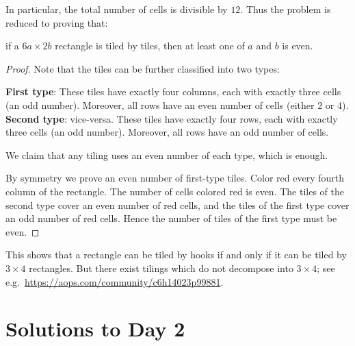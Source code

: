 \documentclass[11pt]{scrartcl}
\begin{document}
In particular, the total number of cells is divisible by $12$.
Thus the problem is reduced to proving that:
\begin{claim*}
  if a $6a \times 2b$ rectangle is tiled by tiles,
  then at least one of $a$ and $b$ is even.
\end{claim*}
\begin{proof}
  Note that the tiles can be further classified into two types:
  \begin{itemize}
    \ii \textbf{First type}: These tiles have exactly four columns,
    each with exactly three cells (an odd number).
    Moreover, all rows have an even number of cells (either $2$ or $4$).
    \ii \textbf{Second type}: vice-versa.
    These tiles have exactly four rows,
    each with exactly three cells (an odd number).
    Moreover, all rows have an odd number of cells.
  \end{itemize}
  We claim that any tiling uses an even number of each type, which is enough.

  By symmetry we prove an even number of first-type tiles.
  Color red every fourth column of the rectangle.
  The number of cells colored red is even.
  The tiles of the second type cover an even number of red cells,
  and the tiles of the first type cover an odd number of red cells.
  Hence the number of tiles of the first type must be even.
\end{proof}

\begin{remark*}
  This shows that a rectangle can be tiled by hooks
  if and only if it can be tiled by $3 \times 4$ rectangles.
  But there exist tilings which do not decompose into $3 \times 4$;
  see e.g.\ \url{https://aops.com/community/c6h14023p99881}.
\end{remark*}
\pagebreak

\section{Solutions to Day 2}
\end{document}
